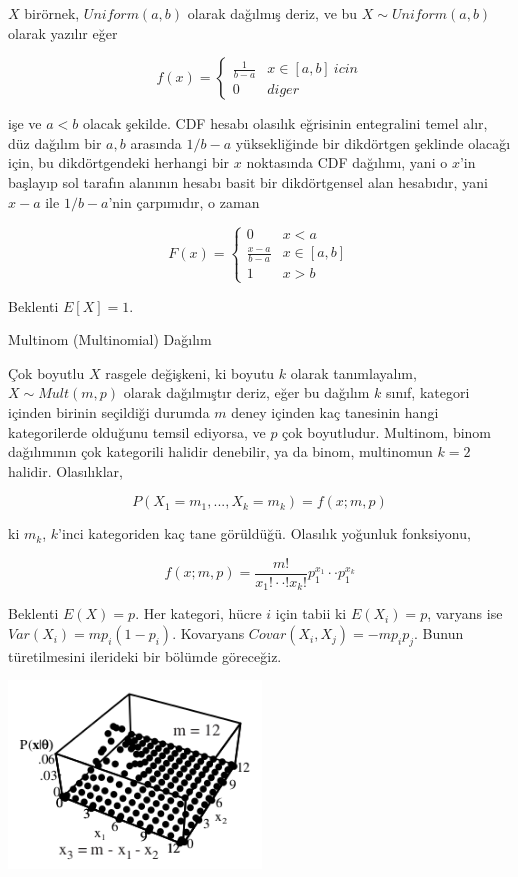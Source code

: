 \documentclass[12pt,fleqn]{article}\usepackage{../../common}
\begin{document}
$X$ birörnek, $Uniform(a,b)$ olarak dağılmış deriz, ve  bu 
$X \sim Uniform(a,b)$ olarak yazılır eğer 

$$ f(x)  = 
\left\{ \begin{array}{ll}
\frac{ 1}{b-a} & x \in [a,b] \ icin \\
0 & diger
\end{array} \right.
 $$

işe ve $a<b$ olacak şekilde. CDF hesabı olasılık eğrisinin entegralini
temel alır, düz dağılım bir $a,b$ arasında $1/b-a$ yüksekliğinde bir 
dikdörtgen şeklinde olacağı için, bu dikdörtgendeki herhangi bir $x$
noktasında CDF dağılımı, yani o $x$'in başlayıp sol tarafın alanının hesabı
basit bir dikdörtgensel alan hesabıdır, yani $x-a$ ile $1/b-a$'nin
çarpımıdır, o zaman 

$$ F(x) = 
\left\{ \begin{array}{ll}
0 & x < a \\
\frac{ x-a}{b-a} & x \in [a,b] \\
1 & x > b
\end{array} \right.
 $$

Beklenti $E[X] = 1$. 

Multinom (Multinomial) Dağılım 

Çok boyutlu $X$ rasgele değişkeni, ki boyutu $k$ olarak tanımlayalım, 
$X \sim Mult(m,p)$ olarak dağılmıştır deriz, eğer bu dağılım $k$ sınıf, kategori
içinden birinin seçildiği durumda $m$ deney içinden kaç tanesinin hangi
kategorilerde olduğunu temsil ediyorsa, ve $p$ çok boyutludur. Multinom, 
binom dağılımının çok kategorili halidir denebilir, ya da binom, 
multinomun $k=2$ halidir. Olasılıklar,

$$ P(X_1=m_1,...,X_k=m_k) = f(x;m,p) $$

ki $m_k$, $k$'inci kategoriden kaç tane görüldüğü. Olasılık yoğunluk
fonksiyonu,

$$ f(x;m,p) = \frac{m!}{x_1! \cdot \cdot !x_k!} p_{1}^{x_1} \cdot \cdot  p_{1}^{x_k} $$

Beklenti $ E(X) = p $. Her kategori, hücre $i$ için tabii ki $ E(X_i) = p$, 
varyans ise $Var(X_i) = m p_i(1-p_i)$. Kovaryans $Covar(X_i,X_j) =
-mp_ip_j$. 
Bunun türetilmesini ilerideki bir bölümde göreceğiz. 

\includegraphics[height=5cm]{multinom.png}
\end{document}
